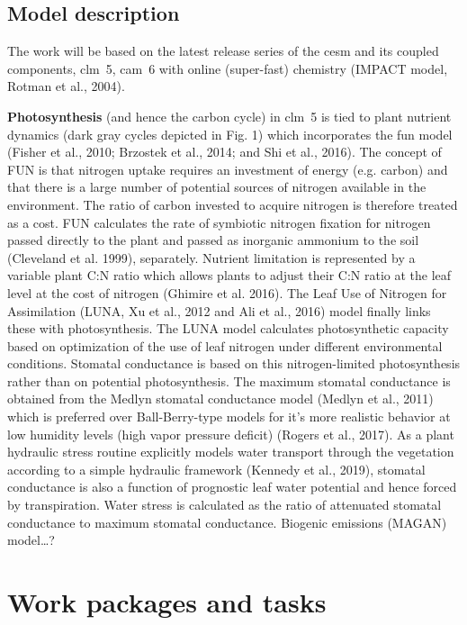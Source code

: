 \documentclass[11pt, a4paper, oneside, article]{memoir}
\begin{document}
\section*{Model description}
The work will be based on the latest release series of the \gls{cesm} and its coupled components, \gls{clm}~5, \gls{cam}~6 with online (super-fast) chemistry (IMPACT model, Rotman et al., 2004).


\textbf{Photosynthesis} (and hence the carbon cycle) in \gls{clm}~5 is tied to plant nutrient dynamics (dark gray cycles depicted in Fig. 1) which incorporates the \gls{fun} model (Fisher et al., 2010; Brzostek et al., 2014; and Shi et al., 2016). The concept of FUN is that nitrogen uptake requires an investment of energy (e.g. carbon) and that there is a large number of potential sources of nitrogen available in the environment. The ratio of carbon invested to acquire nitrogen is therefore treated as a cost. FUN calculates the rate of symbiotic nitrogen fixation for nitrogen passed directly to the plant and passed as inorganic ammonium to the soil (Cleveland et al. 1999), separately. Nutrient limitation is represented by a variable plant C:N ratio which allows plants to adjust their C:N ratio at the leaf level at the cost of nitrogen (Ghimire et al. 2016). The Leaf Use of Nitrogen for Assimilation (LUNA, Xu et al., 2012 and Ali et al., 2016) model finally links these with photosynthesis. The LUNA model calculates photosynthetic capacity based on optimization of the use of leaf nitrogen under different environmental conditions. Stomatal conductance is based on this nitrogen-limited photosynthesis rather than on potential photosynthesis. The maximum stomatal conductance is obtained from the Medlyn stomatal conductance model (Medlyn et al., 2011) which is preferred over Ball-Berry-type models for it’s more realistic behavior at low humidity levels (high vapor pressure deficit) (Rogers et al., 2017).  
As a plant hydraulic stress routine explicitly models water transport through the vegetation according to a simple hydraulic framework (Kennedy et al., 2019), stomatal conductance is also a function of prognostic leaf water potential and hence forced by transpiration. Water stress is calculated as the ratio of attenuated stomatal conductance to maximum stomatal conductance.
Biogenic emissions (MAGAN) model…?

\chapter{Work packages and tasks}

\printglossaries

\newpage
\printbibliography[env=bibliography]
\end{document}
